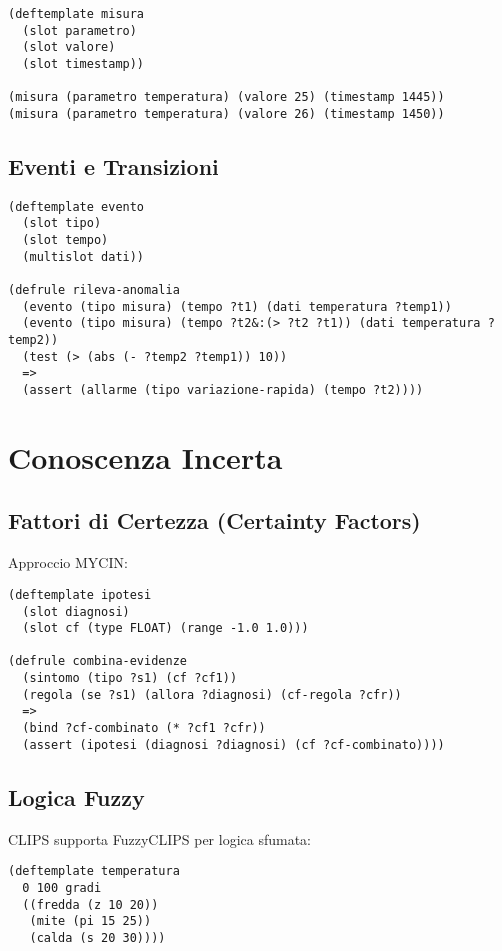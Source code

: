 \begin{lstlisting}[language=CLIPS]
(deftemplate misura
  (slot parametro)
  (slot valore)
  (slot timestamp))

(misura (parametro temperatura) (valore 25) (timestamp 1445))
(misura (parametro temperatura) (valore 26) (timestamp 1450))
\end{lstlisting}

\subsection{Eventi e Transizioni}

\begin{lstlisting}[language=CLIPS]
(deftemplate evento
  (slot tipo)
  (slot tempo)
  (multislot dati))

(defrule rileva-anomalia
  (evento (tipo misura) (tempo ?t1) (dati temperatura ?temp1))
  (evento (tipo misura) (tempo ?t2&:(> ?t2 ?t1)) (dati temperatura ?temp2))
  (test (> (abs (- ?temp2 ?temp1)) 10))
  =>
  (assert (allarme (tipo variazione-rapida) (tempo ?t2))))
\end{lstlisting}

\section{Conoscenza Incerta}

\subsection{Fattori di Certezza (Certainty Factors)}

Approccio MYCIN:

\begin{lstlisting}[language=CLIPS]
(deftemplate ipotesi
  (slot diagnosi)
  (slot cf (type FLOAT) (range -1.0 1.0)))

(defrule combina-evidenze
  (sintomo (tipo ?s1) (cf ?cf1))
  (regola (se ?s1) (allora ?diagnosi) (cf-regola ?cfr))
  =>
  (bind ?cf-combinato (* ?cf1 ?cfr))
  (assert (ipotesi (diagnosi ?diagnosi) (cf ?cf-combinato))))
\end{lstlisting}

\subsection{Logica Fuzzy}

CLIPS supporta FuzzyCLIPS per logica sfumata:

\begin{verbatim}
(deftemplate temperatura
  0 100 gradi
  ((fredda (z 10 20))
   (mite (pi 15 25))
   (calda (s 20 30))))
\end{verbatim}

